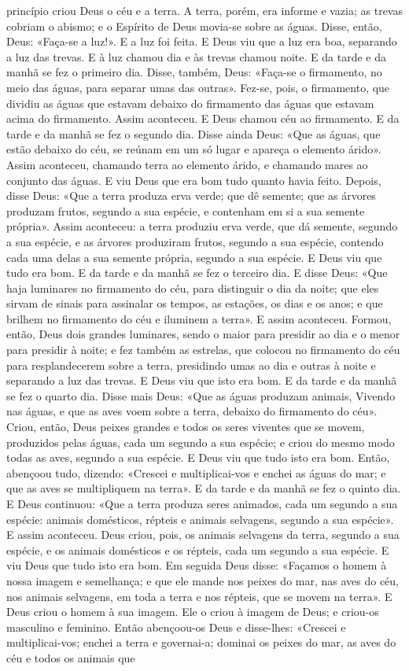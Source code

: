 \begin{paracol}{2}
{ princípio criou Deus o céu e a terra. A terra, porém, era informe e vazia; as trevas cobriam o abismo; e o Espírito de Deus movia-se sobre as águas. Disse, então, Deus: «Faça-se a luz!». E a luz foi feita. E Deus viu que a luz era boa, separando a luz das trevas. E à luz chamou dia e às trevas chamou noite. E da tarde e da manhã se fez o primeiro dia. Disse, também, Deus: «Faça-se o firmamento, no meio das águas, para separar umas das outras». Fez-se, pois, o firmamento, que dividiu as águas que estavam debaixo do firmamento das águas que estavam acima do firmamento. Assim aconteceu. E Deus chamou céu ao firmamento. E da tarde e da manhã se fez o segundo dia. Disse ainda Deus: «Que as águas, que estão debaixo do céu, se reúnam em um só lugar e apareça o elemento árido». Assim aconteceu, chamando terra ao elemento árido, e chamando mares ao conjunto das águas. E viu Deus que era bom tudo quanto havia feito. Depois, disse Deus: «Que a terra produza erva verde; que dê semente; que as árvores produzam frutos, segundo a sua espécie, e contenham em si a sua semente própria». Assim aconteceu: a terra produziu erva verde, que dá semente, segundo a sua espécie, e as árvores produziram frutos, segundo a sua espécie, contendo cada uma delas a sua semente própria, segundo a sua espécie. E Deus viu que tudo era bom. E da tarde e da manhã se fez o terceiro dia. E disse Deus: «Que haja luminares no firmamento do céu, para distinguir o dia da noite; que eles sirvam de sinais para assinalar os tempos, as estações, os dias e os anos; e que brilhem no firmamento do céu e iluminem a terra». E assim aconteceu. Formou, então, Deus dois grandes luminares, sendo o maior para presidir ao dia e o menor para presidir à noite; e fez também as estrelas, que colocou no firmamento do céu para resplandecerem sobre a terra, presidindo umas ao dia e outras à noite e separando a luz das trevas. E Deus viu que isto era bom. E da tarde e da manhã se fez o quarto dia. Disse mais Deus: «Que as águas produzam animais, Vivendo nas águas, e que as aves voem sobre a terra, debaixo do firmamento do céu». Criou, então, Deus peixes grandes e todos os seres viventes que se movem, produzidos pelas águas, cada um segundo a sua espécie; e criou do mesmo modo todas as aves, segundo a sua espécie. E Deus viu que tudo isto era bom. Então, abençoou tudo, dizendo: «Crescei e multiplicai-vos e enchei as águas do mar; e que as aves se multipliquem na terra». E da tarde e da manhã se fez o quinto dia. E Deus continuou: «Que a terra produza seres animados, cada um segundo a sua espécie: animais domésticos, répteis e animais selvagens, segundo a sua espécie». E assim aconteceu. Deus criou, pois, os animais selvagens da terra, segundo a sua espécie, e os animais domésticos e os répteis, cada um segundo a sua espécie. E viu Deus que tudo isto era bom. Em seguida Deus disse: «Façamos o homem à nossa imagem e semelhança; e que ele mande nos peixes do mar, nas aves do céu, nos animais selvagens, em toda a terra e nos répteis, que se movem na terra». E Deus criou o homem à sua imagem. Ele o criou à imagem de Deus; e criou-os masculino e feminino. Então abençoou-os Deus e disse-lhes: «Crescei e multiplicai-vos; enchei a terra e governai-a; dominai os peixes do mar, as aves do céu e todos os animais que }
\end{paracol}
